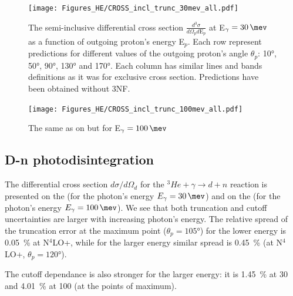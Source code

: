         \begin{figure}[h]
            \begin{center}
            \texttt{[image: Figures\_HE/CROSS\_incl\_trunc\_30mev\_all.pdf]}
            \end{center}
            \caption{The semi-inclusive differential cross section $\frac{d^3\sigma}{d\Omega_p d\text{E}_p}$
            at E$_\gamma = \SI{30}{\mev}$ as a function of outgoing proton's energy E$_p$. Each row represent 
            predictions for different values of the outgoing proton's angle $\theta_p$: 
            \ang{10}, \ang{50}, \ang{90}, \ang{130} and \ang{170}. Each column has similar 
            lines and bands definitions as it was for exclusive cross section.  
            Predictions have been obtained without 3NF.}
            \label{CROSS_HE_INCL_30MEV_2NF}
        \end{figure}

        \begin{figure}[h]
            \begin{center}
            \texttt{[image: Figures\_HE/CROSS\_incl\_trunc\_100mev\_all.pdf]}
            \end{center}
            \caption{The same as on  but for E$_\gamma = \SI{100}{\mev}$}
            \label{CROSS_HE_INCL_100MEV_2NF}
        \end{figure}


\clearpage


\subsection{D-n photodisintegration}

    The differential cross section $d\sigma/d\Omega_d$ for the $^3He + \gamma \rightarrow d + n$ reaction
    is presented on the  (for the photon's energy $E_\gamma = \SI{30}{\mev}$)
    and on the  (for the photon's energy $E_\gamma = \SI{100}{\mev}$).
    We see that both truncation and cutoff uncertainties are larger with increasing photon's energy.
    The relative spread of the truncation error at the maximum point ($\theta_p = \ang{105}$)
    for the lower energy is \SI{0.05}{\percent} at N$^4$LO+, while for the larger energy
    similar spread is \SI{0.45}{\percent} (at N$^4$LO+, $\theta_p = \ang{120}$).

    The cutoff dependance is also stronger for the larger energy:
    it is  \SI{1.45}{\percent} at \SI{30}{\mev} and \SI{4.01}{\percent} at \SI{100}{\mev}
    (at the points of maximum). 

